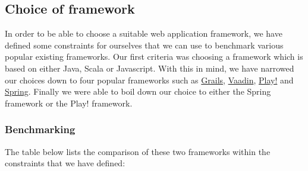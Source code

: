\subsection{Choice of framework}
In order to be able to choose a suitable web application framework, we have defined some  constraints for ourselves that we can use to benchmark various popular existing frameworks. Our first criteria was choosing a framework which is based on either Java, Scala or Javascript. With this in mind, we have narrowed our choices down to four popular frameworks such as \href{https://grails.org/}{Grails}, \href{https://vaadin.com/home}{Vaadin}, \href{https://www.playframework.com/}{Play!} and \href{http://projects.spring.io/spring-framework/}{Spring}. Finally we were able to boil down our choice to either the Spring framework or the Play! framework.
\subsubsection{Benchmarking}
 The table below lists the comparison of these two frameworks within the constraints that we have defined:\\\\

